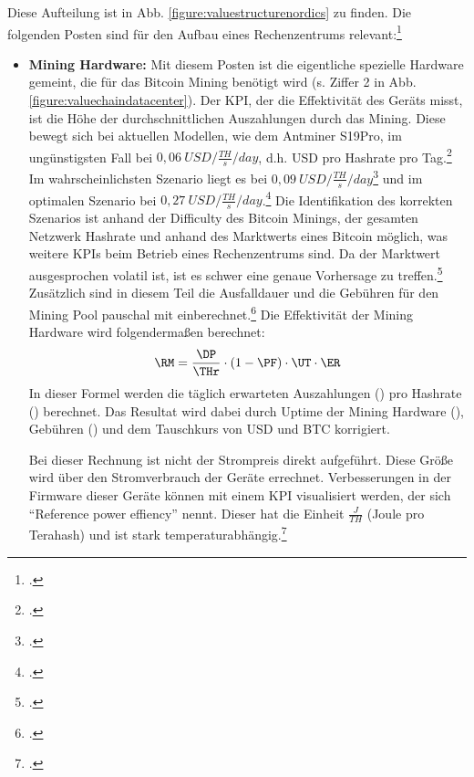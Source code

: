 Diese Aufteilung ist in Abb. \ref{figure:valuestructurenordics} zu finden. Die folgenden Posten sind für den Aufbau
eines Rechenzentrums relevant:\footcite[Vgl.][]{appendix:capex}
\begin{itemize}
    \item \textbf{Mining Hardware: }Mit diesem Posten ist die eigentliche spezielle Hardware gemeint, die für das
    Bitcoin Mining benötigt wird (s. Ziffer 2 in Abb. \ref{figure:valuechaindatacenter}). Der \ac{KPI}, der die
    Effektivität des Geräts misst, ist die Höhe der durchschnittlichen Auszahlungen durch das Mining. Diese bewegt
    sich bei aktuellen Modellen, wie dem Antminer S19Pro, im ungünstigsten Fall bei $0,06\ USD / \frac{TH}{s} / day$, d.h.
    \ac{USD} pro Hashrate pro Tag.\footcite[Vgl.][]{appendix:worstcasescenario} Im wahrscheinlichsten Szenario liegt
    es bei $0,09\ USD / \frac{TH}{s} / day$\footcite[Vgl.][]{appendix:mostprobablescenario} und im optimalen Szenario
    bei $0,27\ USD / \frac{TH}{s} / day$.\footcite[Vgl.][]{appendix:optimalscenario} Die Identifikation des korrekten
    Szenarios ist anhand der Difficulty des Bitcoin Minings, der gesamten Netzwerk Hashrate und anhand des Marktwerts
    eines Bitcoin möglich, was weitere \acp{KPI} beim Betrieb eines Rechenzentrums sind. Da der Marktwert ausgesprochen
    volatil ist, ist es schwer eine genaue Vorhersage zu treffen.\footcite[Vgl.][S. 325]{badertscher2017bitcoin} Zusätzlich
    sind in diesem Teil die Ausfalldauer und die Gebühren für den Mining Pool pauschal mit
    einberechnet.\footcite[Vgl.][]{appendix:s19proassumptions} Die Effektivität der Mining Hardware wird folgendermaßen
    berechnet:
    \begin{equation}
        \RM = \frac{\DP}{\THr}\cdot(1-\PF)\cdot\UT\cdot\ER
    \end{equation}
    In dieser Formel werden die täglich erwarteten Auszahlungen (\DP) pro Hashrate (\THr) berechnet. Das Resultat wird
    dabei durch Uptime der Mining Hardware (\UT), Gebühren (\PF) und dem Tauschkurs von \ac{USD} und \ac{BTC} korrigiert.

    Bei dieser Rechnung ist nicht der Strompreis direkt aufgeführt. Diese Größe wird über den Stromverbrauch der Geräte
    errechnet. Verbesserungen in der Firmware dieser Geräte können mit einem \ac{KPI} visualisiert werden, der sich
    "`Reference power effiency"' nennt. Dieser hat die Einheit $\frac{J}{TH}$ (Joule pro Terahash) und ist stark
    temperaturabhängig.\footcite[Vgl.][]{s19pro2021consumption}


\end{itemize}
